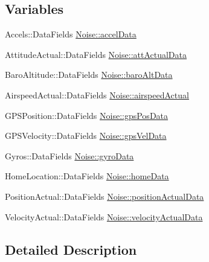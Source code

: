 \subsection*{Variables}
\begin{DoxyCompactItemize}
\item 
Accels\-::\-Data\-Fields \hyperlink{group__hitlplugin_ga20a9e1e87d0a44b532c7e8c44555bdde}{Noise\-::accel\-Data}
\item 
Attitude\-Actual\-::\-Data\-Fields \hyperlink{group__hitlplugin_ga689a709ae944673ff6edd54ab6ca4d7d}{Noise\-::att\-Actual\-Data}
\item 
Baro\-Altitude\-::\-Data\-Fields \hyperlink{group__hitlplugin_gab586e8f2c72c1e42c715debf0bd202b1}{Noise\-::baro\-Alt\-Data}
\item 
Airspeed\-Actual\-::\-Data\-Fields \hyperlink{group__hitlplugin_ga6481423a6f6cc57475e660281ba3d77d}{Noise\-::airspeed\-Actual}
\item 
G\-P\-S\-Position\-::\-Data\-Fields \hyperlink{group__hitlplugin_ga9ec5e3f5256aa25ca8a8556643eb355d}{Noise\-::gps\-Pos\-Data}
\item 
G\-P\-S\-Velocity\-::\-Data\-Fields \hyperlink{group__hitlplugin_gafefa36e4fa6d8da826bbfcf9f604119c}{Noise\-::gps\-Vel\-Data}
\item 
Gyros\-::\-Data\-Fields \hyperlink{group__hitlplugin_gaf3fae05e7092b987f81f25ff7709ffb9}{Noise\-::gyro\-Data}
\item 
Home\-Location\-::\-Data\-Fields \hyperlink{group__hitlplugin_ga3138fe65ade5af4ff6ff614c0956fc0a}{Noise\-::home\-Data}
\item 
Position\-Actual\-::\-Data\-Fields \hyperlink{group__hitlplugin_ga54f9e7005f571fdacf23a67005004b0a}{Noise\-::position\-Actual\-Data}
\item 
Velocity\-Actual\-::\-Data\-Fields \hyperlink{group__hitlplugin_ga45f843b87142396306b05148bf19b766}{Noise\-::velocity\-Actual\-Data}
\end{DoxyCompactItemize}


\subsection{Detailed Description}


